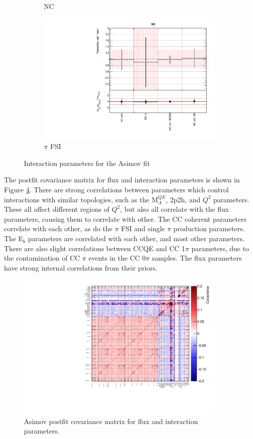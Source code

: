 \begin{figure}
\begin{subfigure}{0.49\textwidth}
  \caption{NC}
  \label{fig:}
\end{subfigure}
\begin{subfigure}{0.49\textwidth}
  \centering
  \includegraphics[width=0.95\linewidth]{figs/asmvxsec4}
  \caption{$\pi$ FSI}
  \label{fig:}
\end{subfigure}
\caption{Interaction parameters for the Asimov fit}
\label{fig:asmvxsec}
\end{figure}

The postfit covariance matrix for flux and interaction parameters is shown in Figure \ref{fig:asmvpostfitcov}. There are strong correlations between parameters which control interactions with similar topologies, such as the M$^{QE}_A$, 2p2h, and $Q^2$ parameters. These all affect different regions of $Q^2$, but also all correlate with the flux parameters, causing them to correlate with other. The CC coherent parameters correlate with each other, as do the $\pi$ FSI and single $\pi$ production parameters. The E$_b$ parameters are correlated with each other, and most other parameters. There are also slight correlations between CCQE and CC 1$\pi$ parameters, due to the contamination of CC $\pi$ events in the CC 0$\pi$ samples. The flux parameters have strong internal correlations from their priors.

\begin{figure}
\centering
\includegraphics*[width=0.9\textwidth,clip]{figs/asmvpostfitcov}
\caption{Asimov postfit covariance matrix for flux and interaction parameters.}\label{fig:asmvpostfitcov}
\end{figure}

